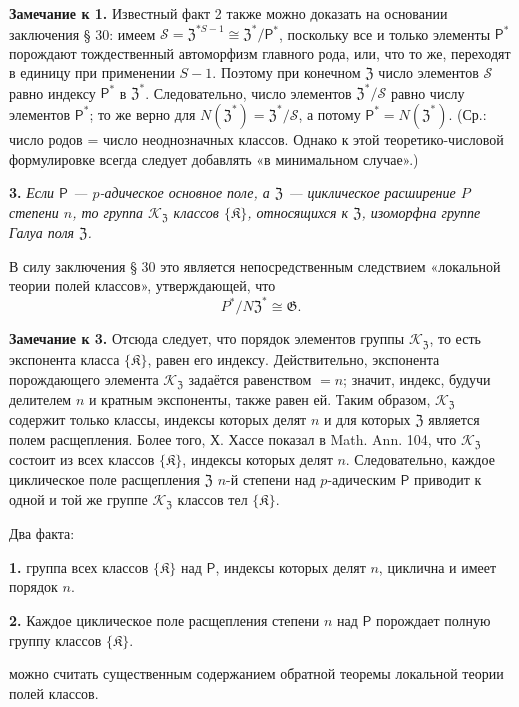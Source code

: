 \documentclass[11pt]{article}
\begin{document}
\noindent\textbf{Замечание к 1.} Известный факт 2 также можно доказать на основании заключения § 30: имеем \(\mathscr S=\mathfrak Z^{*S-1}\cong\mathfrak Z^*/\mathsf{P}^*\), поскольку все и только элементы \(\mathsf{P}^*\) порождают тождественный автоморфизм главного рода, или, что то же, переходят в единицу при применении \(S-1\). Поэтому при конечном \(\mathfrak Z\) число элементов \(\mathscr S\) равно индексу \(\mathsf{P}^*\) в \(\mathfrak Z^*\). Следовательно, число элементов \(\mathfrak Z^*/\mathscr S\) равно числу элементов \(\mathsf{P}^*\); то же верно для \(N(\mathfrak Z^*)=\mathfrak Z^*/\mathscr S\), а потому \(\mathsf{P}^*=N(\mathfrak Z^*)\). (Ср.: число родов = число неоднозначных классов. Однако к этой теоретико-числовой формулировке всегда следует добавлять «в минимальном случае».)

\noindent\textbf{3.} \emph{Если \(\mathsf{P}\) --- \(p\)-адическое основное поле, а \(\mathfrak Z\) --- циклическое расширение \(P\) степени \(n\), то группа \(\mathscr K_{\mathfrak Z}\) классов \(\{\mathfrak K\}\), относящихся к \(\mathfrak Z\), изоморфна группе Галуа поля \(\mathfrak Z\).}

В силу заключения § 30 это является непосредственным следствием «локальной теории полей классов», утверждающей, что
\[
P^*/N\mathfrak Z^*\cong\mathfrak G.
\]

\noindent\textbf{Замечание к 3.} Отсюда следует, что порядок элементов группы \(\mathscr K_{\mathfrak Z}\), то есть экспонента класса \(\{\mathfrak K\}\), равен его индексу. Действительно, экспонента порождающего элемента \(\mathscr K_{\mathfrak Z}\) задаётся равенством \(=n\); значит, индекс, будучи делителем \(n\) и кратным экспоненты, также равен ей. Таким образом, \(\mathscr K_{\mathfrak Z}\) содержит только классы, индексы которых делят \(n\) и для которых \(\mathfrak Z\) является полем расщепления. Более того, Х. Хассе показал в Math. Ann. 104, что \(\mathscr K_{\mathfrak Z}\) состоит из всех классов \(\{\mathfrak K\}\), индексы которых делят \(n\). Следовательно, каждое циклическое поле расщепления \(\mathfrak Z\) \(n\)-й степени над \(p\)-адическим \(\mathsf{P}\) приводит к одной и той же группе \(\mathscr K_{\mathfrak Z}\) классов тел \(\{\mathfrak K\}\).

Два факта:

\noindent\textbf{1.} группа всех классов \(\{\mathfrak K\}\) над \(\mathsf{P}\), индексы которых делят \(n\), циклична и имеет порядок \(n\).

\noindent\textbf{2.} Каждое циклическое поле расщепления степени \(n\) над \(\mathsf{P}\) порождает полную группу классов \(\{\mathfrak K\}\).

можно считать существенным содержанием обратной теоремы локальной теории полей классов.


\clearpage
\end{document}
